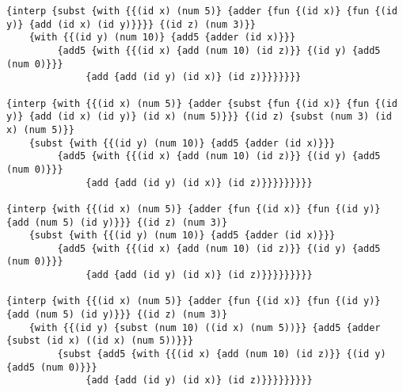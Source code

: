 \documentclass[letterpaper,11pt]{article}
\begin{document}
\begin{verbatim}
{interp {subst {with {{(id x) (num 5)} {adder {fun {(id x)} {fun {(id y)} {add (id x) (id y)}}}} {(id z) (num 3)}}
    {with {{(id y) (num 10)} {add5 {adder (id x)}}}
         {add5 {with {{(id x) {add (num 10) (id z)}} {(id y) {add5 (num 0)}}}
              {add {add (id y) (id x)} (id z)}}}}}}}
              
{interp {with {{(id x) (num 5)} {adder {subst {fun {(id x)} {fun {(id y)} {add (id x) (id y)} (id x) (num 5)}}} {(id z) {subst (num 3) (id x) (num 5)}}
    {subst {with {{(id y) (num 10)} {add5 {adder (id x)}}}
         {add5 {with {{(id x) {add (num 10) (id z)}} {(id y) {add5 (num 0)}}}
              {add {add (id y) (id x)} (id z)}}}}}}}}}      

{interp {with {{(id x) (num 5)} {adder {fun {(id x)} {fun {(id y)} {add (num 5) (id y)}}} {(id z) (num 3)}
    {subst {with {{(id y) (num 10)} {add5 {adder (id x)}}}
         {add5 {with {{(id x) {add (num 10) (id z)}} {(id y) {add5 (num 0)}}}
              {add {add (id y) (id x)} (id z)}}}}}}}}}   

{interp {with {{(id x) (num 5)} {adder {fun {(id x)} {fun {(id y)} {add (num 5) (id y)}}} {(id z) (num 3)}
    {with {{(id y) {subst (num 10) ((id x) (num 5))}} {add5 {adder {subst (id x) ((id x) (num 5))}}}
         {subst {add5 {with {{(id x) {add (num 10) (id z)}} {(id y) {add5 (num 0)}}}
              {add {add (id y) (id x)} (id z)}}}}}}}}}
            

\end{verbatim}
\end{document}
